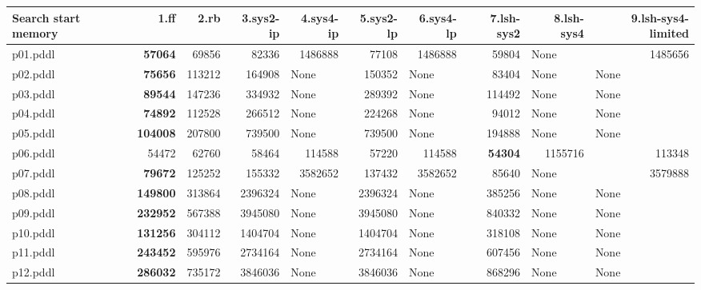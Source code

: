 \documentclass{article}
\begin{document}
\begin{tabular}{@{}lrrrrrrrrr@{}}
Search start memory & 1.ff & 2.rb & 3.sys2-ip & 4.sys4-ip & 5.sys2-lp & 6.sys4-lp & 7.lsh-sys2 & 8.lsh-sys4 & 9.lsh-sys4-limited \\
\midrule
p01.pddl & \textbf{57064} & 69856 & 82336 & 1486888 & 77108 & 1486888 & 59804 & \multicolumn{1}{|l|}{None} & 1485656 \\
p02.pddl & \textbf{75656} & 113212 & 164908 & \multicolumn{1}{|l|}{None} & 150352 & \multicolumn{1}{|l|}{None} & 83404 & \multicolumn{1}{|l|}{None} & \multicolumn{1}{|l|}{None} \\
p03.pddl & \textbf{89544} & 147236 & 334932 & \multicolumn{1}{|l|}{None} & 289392 & \multicolumn{1}{|l|}{None} & 114492 & \multicolumn{1}{|l|}{None} & \multicolumn{1}{|l|}{None} \\
p04.pddl & \textbf{74892} & 112528 & 266512 & \multicolumn{1}{|l|}{None} & 224268 & \multicolumn{1}{|l|}{None} & 94012 & \multicolumn{1}{|l|}{None} & \multicolumn{1}{|l|}{None} \\
p05.pddl & \textbf{104008} & 207800 & 739500 & \multicolumn{1}{|l|}{None} & 739500 & \multicolumn{1}{|l|}{None} & 194888 & \multicolumn{1}{|l|}{None} & \multicolumn{1}{|l|}{None} \\
p06.pddl & 54472 & 62760 & 58464 & 114588 & 57220 & 114588 & \textbf{54304} & 1155716 & 113348 \\
p07.pddl & \textbf{79672} & 125252 & 155332 & 3582652 & 137432 & 3582652 & 85640 & \multicolumn{1}{|l|}{None} & 3579888 \\
p08.pddl & \textbf{149800} & 313864 & 2396324 & \multicolumn{1}{|l|}{None} & 2396324 & \multicolumn{1}{|l|}{None} & 385256 & \multicolumn{1}{|l|}{None} & \multicolumn{1}{|l|}{None} \\
p09.pddl & \textbf{232952} & 567388 & 3945080 & \multicolumn{1}{|l|}{None} & 3945080 & \multicolumn{1}{|l|}{None} & 840332 & \multicolumn{1}{|l|}{None} & \multicolumn{1}{|l|}{None} \\
p10.pddl & \textbf{131256} & 304112 & 1404704 & \multicolumn{1}{|l|}{None} & 1404704 & \multicolumn{1}{|l|}{None} & 318108 & \multicolumn{1}{|l|}{None} & \multicolumn{1}{|l|}{None} \\
p11.pddl & \textbf{243452} & 595976 & 2734164 & \multicolumn{1}{|l|}{None} & 2734164 & \multicolumn{1}{|l|}{None} & 607456 & \multicolumn{1}{|l|}{None} & \multicolumn{1}{|l|}{None} \\
p12.pddl & \textbf{286032} & 735172 & 3846036 & \multicolumn{1}{|l|}{None} & 3846036 & \multicolumn{1}{|l|}{None} & 868296 & \multicolumn{1}{|l|}{None} & \multicolumn{1}{|l|}{None} \\

\end{tabular}
\end{document}
